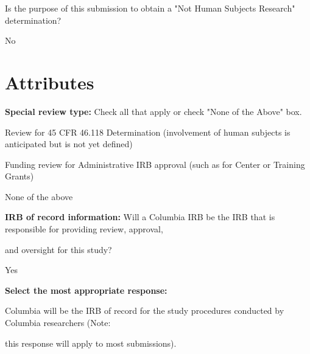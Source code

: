 \documentclass[10pt, letterpaper]{article}
\begin{document}
\vspace{0.5em}

\vspace{0.5em}

\vspace{0.5em}

Is the purpose of this submission to obtain a "Not Human Subjects Research" determination?

No

\vspace{0.5em}

\vspace{0.5em}

\vspace{0.5em}

\section*{Attributes}

\vspace{0.5em}

\noindent \textbf{Special review type:} Check all that apply or check "None of the Above" box.

\noindent \makebox[0pt][l]{$\square$}\hspace{1.2em}Review for 45 CFR 46.118 Determination (involvement of human subjects is anticipated but is not yet defined)

\noindent \makebox[0pt][l]{$\square$}\hspace{1.2em}Funding review for Administrative IRB approval (such as for Center or Training Grants)

\noindent \makebox[0pt][l]{\color{columbiablue_official}$\boxtimes$}\hspace{1.2em}None of the above

\vspace{0.5em}

\vspace{0.5em}

\noindent \textbf{IRB of record information:} Will a Columbia IRB be the IRB that is responsible for providing review, approval,

and oversight for this study?

Yes

\noindent \textbf{Select the most appropriate response:}

Columbia will be the IRB of record for the study procedures conducted by Columbia researchers (Note:

this response will apply to most submissions).
\end{document}
